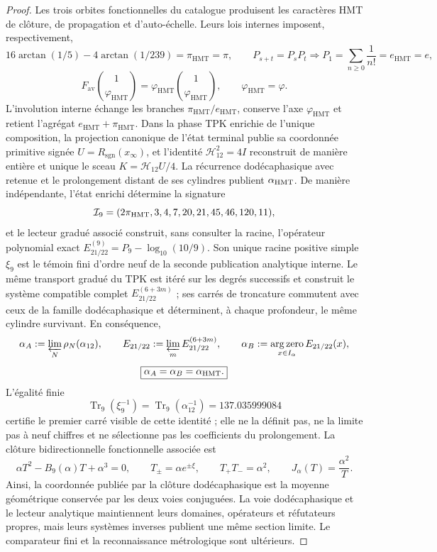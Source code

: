 \begin{proof}
Les trois orbites fonctionnelles du catalogue produisent les caractères HMT de
clôture, de propagation et d'auto-échelle. Leurs lois internes imposent,
respectivement,
\[
16\arctan(1/5)-4\arctan(1/239)=\pi_{\mathrm{HMT}}=\pi,
\qquad
P_{s+t}=P_sP_t\Rightarrow
P_1=\sum_{n\ge0}\frac1{n!}=e_{\mathrm{HMT}}=e,
\]
\[
F_{\mathrm{av}}\binom1{\varphi_{\mathrm{HMT}}}
=\varphi_{\mathrm{HMT}}\binom1{\varphi_{\mathrm{HMT}}},
\qquad \varphi_{\mathrm{HMT}}=\varphi.
\]
L'involution interne échange les branches
\(\pi_{\mathrm{HMT}}/e_{\mathrm{HMT}}\), conserve l'axe
\(\varphi_{\mathrm{HMT}}\) et retient l'agrégat
\(e_{\mathrm{HMT}}+\pi_{\mathrm{HMT}}\). Dans la phase TPK enrichie de
l'unique composition, la projection canonique de l'état terminal publie sa coordonnée primitive
signée
\(U=R_{\mathrm{sgn}}(x_\infty)\), et l'identité
\(\mathcal H_{12}^2=4I\) reconstruit de manière entière et unique le sceau
\(K=\mathcal H_{12}U/4\). La récurrence dodécaphasique avec retenue et le
prolongement distant de ses cylindres publient \(\alpha_{\rm HMT}\). De
manière indépendante, l'état enrichi détermine la signature
\[
 \mathcal I_9=(2\pi_{\rm HMT},3,4,7,20,21,45,46,120,11),
\]
et le lecteur gradué associé construit, sans consulter la racine, l'opérateur
polynomial exact
\(E_{21/22}^{(9)}=P_9-\log_{10}(10/9)\). Son unique racine positive simple
\(\xi_9\) est le témoin fini d'ordre neuf de la seconde publication
analytique interne. Le même transport gradué du TPK est itéré sur les
degrés successifs et construit le système compatible complet
\(E_{21/22}^{(6+3m)}\) ; ses carrés de troncature commutent avec ceux de la
famille dodécaphasique et déterminent, à chaque profondeur, le même cylindre
survivant. En conséquence,
\[
 \alpha_A:=\varprojlim_N\rho_N(\alpha_{12}),\qquad
 E_{21/22}:=\varprojlim_mE_{21/22}^{(6+3m)},\qquad
 \alpha_B:=\operatorname*{arg\,zero}_{x\in I_\alpha}E_{21/22}(x),
\]
\[
 \boxed{\alpha_A=\alpha_B=\alpha_{\rm HMT}.}
\]
L'égalité finie
\[
 \operatorname{Tr}_9(\xi_9^{-1})
 =\operatorname{Tr}_9(\alpha_{12}^{-1})=137.035999084
\]
certifie le premier carré visible de cette identité ; elle ne la définit pas, ne la
limite pas à neuf chiffres et ne sélectionne pas les coefficients du prolongement.
La clôture bidirectionnelle fonctionnelle associée est
\[
\alpha T^2-B_9(\alpha)T+\alpha^3=0,
\qquad
T_\pm=\alpha e^{\pm\xi},
\qquad
T_+T_-=\alpha^2,
\qquad
J_\alpha(T)=\frac{\alpha^2}{T}.
\]
Ainsi, la coordonnée publiée par la clôture dodécaphasique est la moyenne
géométrique conservée par les deux voies conjuguées. La voie dodécaphasique et le
lecteur analytique maintiennent leurs domaines, opérateurs et réfutateurs propres, mais
leurs systèmes inverses publient une même section limite. Le comparateur
fini et la reconnaissance métrologique sont ultérieurs.


\end{proof}
